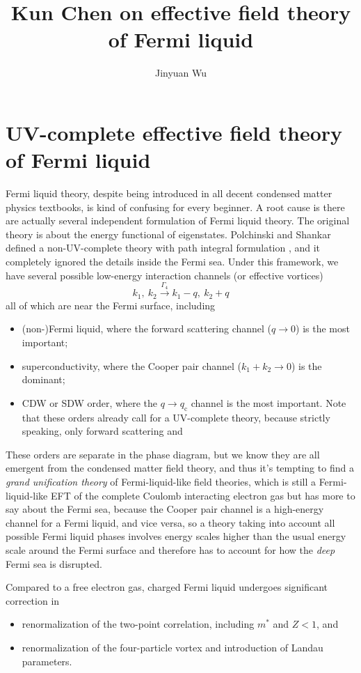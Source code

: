 \documentclass[hyperref, a4paper]{article}
\title{Kun Chen on effective field theory of Fermi liquid}
\author{Jinyuan Wu}
\begin{document}
\maketitle

\section{UV-complete effective field theory of Fermi liquid}

Fermi liquid theory, despite being introduced in all decent condensed matter physics textbooks, is kind of 
confusing for every beginner. A root cause is there are actually several independent formulation of 
Fermi liquid theory. The original theory is about the energy functional of eigenstates. 
Polchinski and Shankar defined a non-UV-complete theory with path integral formulation \cite{Polchinski-fermi},
and it completely ignored the details inside the Fermi sea. Under this framework, we have several possible low-energy
interaction channels (or effective vortices)
\[
    k_1 , \  k_2 \stackrel{\Gamma_4}{\longrightarrow} k_1 - q , \  k_2 + q
\]
all of which are near the Fermi surface, including
\begin{itemize}
    \item (non-)Fermi liquid, where the forward scattering channel ($q \to 0$) is the most important;
    \item superconductivity, where the Cooper pair channel ($k_1 + k_2 \to 0$) is the dominant;
    \item CDW or SDW order, where the $q \to q_\text{c}$ channel is the most important. Note that 
    these orders already call for a UV-complete theory, because strictly speaking, only forward
    scattering and 
\end{itemize}
These orders are separate in the phase diagram, but we know they are all emergent from the condensed matter 
field theory, and thus it's tempting to find a \emph{grand unification theory} of Fermi-liquid-like 
field theories, which is still a Fermi-liquid-like EFT of the complete Coulomb interacting electron gas 
but has more to say about the Fermi sea, because the Cooper pair channel is a high-energy channel for a 
Fermi liquid, and vice versa, so a theory taking into account all possible Fermi liquid phases involves 
energy scales higher than the usual energy scale around the Fermi surface and therefore has to account for 
how the \emph{deep} Fermi sea is disrupted. 

Compared to a free electron gas, charged Fermi liquid undergoes significant correction in 
\begin{itemize}
    \item renormalization of the two-point correlation, including $m^*$ and $Z < 1$, and
    \item renormalization of the four-particle vortex and introduction of Landau parameters.
\end{itemize}
\end{document}
